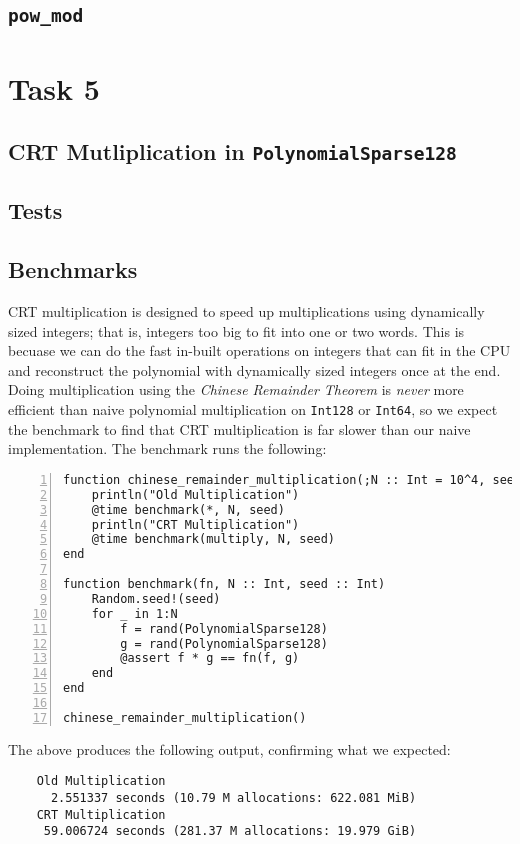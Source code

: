 \documentclass{article}
\theoremstyle{plain}
\numberwithin{theorem}{section}
\numberwithin{example}{section}
\theoremstyle{definition}
\numberwithin{definition}{section}
\begin{document}
\bigbreak

\subsection{\texttt{pow\_mod}}

\bigbreak

\section{Task 5} \label{crt}
\subsection{CRT Mutliplication in \texttt{PolynomialSparse128}}

\bigbreak

\subsection{Tests}

\bigbreak

\subsection{Benchmarks}
CRT multiplication is designed to speed up multiplications using dynamically
sized integers; that is, integers too big to fit into one or two words. This is
becuase we can do the fast in-built operations on integers that can fit in the
CPU and reconstruct the polynomial with dynamically sized integers once at the
end. Doing multiplication using the \emph{Chinese Remainder Theorem} is
\emph{never} more efficient than naive polynomial multiplication on
\texttt{Int128} or \texttt{Int64}, so we expect the benchmark to find that CRT
multiplication is far slower than our naive implementation. The benchmark runs
the following:

\begin{codebox}
    \begin{Verbatim}[numbers=left,xleftmargin=5mm]
function chinese_remainder_multiplication(;N :: Int = 10^4, seed :: Int = 0)
    println("Old Multiplication")
    @time benchmark(*, N, seed)
    println("CRT Multiplication")
    @time benchmark(multiply, N, seed)
end

function benchmark(fn, N :: Int, seed :: Int)
    Random.seed!(seed)
    for _ in 1:N
        f = rand(PolynomialSparse128)
        g = rand(PolynomialSparse128)
        @assert f * g == fn(f, g)
    end
end

chinese_remainder_multiplication()
    \end{Verbatim}
\end{codebox}

The above produces the following output, confirming what we expected:

\begin{Verbatim}
    Old Multiplication
      2.551337 seconds (10.79 M allocations: 622.081 MiB)
    CRT Multiplication
     59.006724 seconds (281.37 M allocations: 19.979 GiB)
\end{Verbatim}
\end{document}
